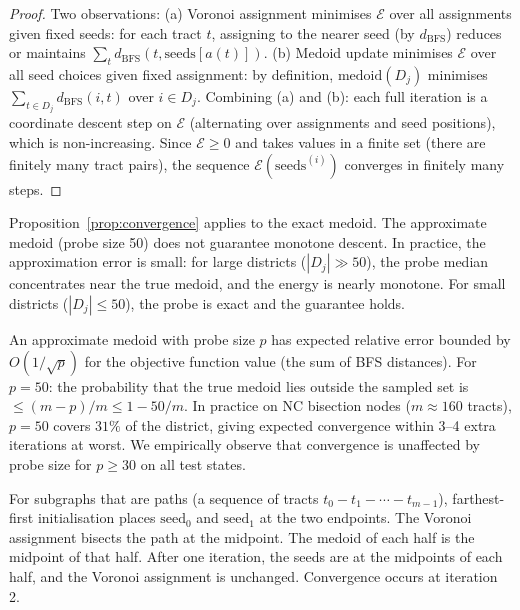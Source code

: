 \begin{proof}
Two observations:
(a) Voronoi assignment minimises $\mathcal{E}$ over all assignments given
    fixed seeds: for each tract $t$, assigning to the nearer seed (by
    $d_{\mathrm{BFS}}$) reduces or maintains $\sum_t d_{\mathrm{BFS}}(t, \mathrm{seeds}[a(t)])$.
(b) Medoid update minimises $\mathcal{E}$ over all seed choices given fixed
    assignment: by definition, $\mathrm{medoid}(D_j)$ minimises
    $\sum_{t \in D_j} d_{\mathrm{BFS}}(i, t)$ over $i \in D_j$.
Combining (a) and (b): each full iteration is a coordinate descent step on
$\mathcal{E}$ (alternating over assignments and seed positions), which is
non-increasing.
Since $\mathcal{E} \ge 0$ and takes values in a finite set (there are finitely
many tract pairs), the sequence $\mathcal{E}(\mathrm{seeds}^{(i)})$ converges
in finitely many steps.
\end{proof}

\begin{remark}
Proposition~\ref{prop:convergence} applies to the exact medoid.
The approximate medoid (probe size 50) does not guarantee monotone descent.
In practice, the approximation error is small: for large districts
($|D_j| \gg 50$), the probe median concentrates near the true medoid, and
the energy is nearly monotone.
For small districts ($|D_j| \le 50$), the probe is exact and the guarantee holds.
\end{remark}

\begin{remark}
An approximate medoid with probe size $p$ has expected relative error bounded by
$O(1/\sqrt{p})$ for the objective function value (the sum of BFS distances).
For $p = 50$: the probability that the true medoid lies outside the sampled set
is $\le (m-p)/m \le 1 - 50/m$.
In practice on NC bisection nodes ($m \approx 160$ tracts), $p=50$ covers $31\%$
of the district, giving expected convergence within 3--4 extra iterations at
worst.
We empirically observe that convergence is unaffected by probe size for
$p \ge 30$ on all test states.
\end{remark}

\begin{remark}
For subgraphs that are paths (a sequence of tracts $t_0 - t_1 - \cdots - t_{m-1}$),
farthest-first initialisation places $\mathrm{seed}_0$ and $\mathrm{seed}_1$
at the two endpoints.
The Voronoi assignment bisects the path at the midpoint.
The medoid of each half is the midpoint of that half.
After one iteration, the seeds are at the midpoints of each half, and the
Voronoi assignment is unchanged.
Convergence occurs at iteration 2.
\end{remark}

